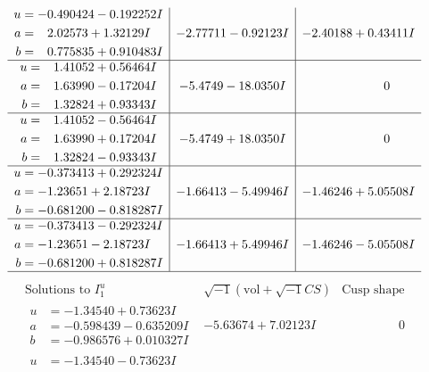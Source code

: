 \documentclass[1p]{elsarticle_modified}
\theoremstyle{definition}
\newcommand{\I}{\sqrt{-1}}
\begin{document}
$$\begin{array}{c|c|c}
\begin{aligned}
u &= -0.490424 - 0.192252 I \\
a &= \phantom{-}2.02573 + 1.32129 I \\
b &= \phantom{-}0.775835 + 0.910483 I\end{aligned}
 & -2.77711 - 0.92123 I & -2.40188 + 0.43411 I \\ \hline\begin{aligned}
u &= \phantom{-}1.41052 + 0.56464 I \\
a &= \phantom{-}1.63990 - 0.17204 I \\
b &= \phantom{-}1.32824 + 0.93343 I\end{aligned}
 & -5.4749 - 18.0350 I & \phantom{-0.000000 } 0 \\ \hline\begin{aligned}
u &= \phantom{-}1.41052 - 0.56464 I \\
a &= \phantom{-}1.63990 + 0.17204 I \\
b &= \phantom{-}1.32824 - 0.93343 I\end{aligned}
 & -5.4749 + 18.0350 I & \phantom{-0.000000 } 0 \\ \hline\begin{aligned}
u &= -0.373413 + 0.292324 I \\
a &= -1.23651 + 2.18723 I \\
b &= -0.681200 - 0.818287 I\end{aligned}
 & -1.66413 - 5.49946 I & -1.46246 + 5.05508 I \\ \hline\begin{aligned}
u &= -0.373413 - 0.292324 I \\
a &= -1.23651 - 2.18723 I \\
b &= -0.681200 + 0.818287 I\end{aligned}
 & -1.66413 + 5.49946 I & -1.46246 - 5.05508 I\\
 \hline 
 \end{array}$$\newpage$$\begin{array}{c|c|c}  
\text{Solutions to }I^u_{1}& \I (\text{vol} + \sqrt{-1}CS) & \text{Cusp shape}\\
 \hline 
\begin{aligned}
u &= -1.34540 + 0.73623 I \\
a &= -0.598439 - 0.635209 I \\
b &= -0.986576 + 0.010327 I\end{aligned}
 & -5.63674 + 7.02123 I & \phantom{-0.000000 } 0 \\ \hline\begin{aligned}
u &= -1.34540 - 0.73623 I \\

\end{aligned}
\end{array}$$
\end{document}

